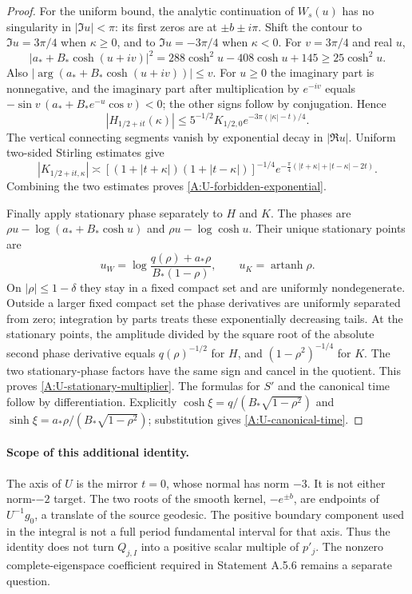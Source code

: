 \begin{proof}
For the uniform bound, the analytic continuation of $W_s(u)$
has no singularity in $|\Im u|<\pi$: its first zeros are
at $\pm b\pm i\pi$.
Shift the contour to $\Im u=3\pi/4$ when $\kappa\geq0$,
and to $\Im u=-3\pi/4$ when $\kappa<0$.
For $v=3\pi/4$ and real $u$,
\[
 |a_*+B_*\cosh(u+iv)|^2
   =288\cosh^2u-408\cosh u+145
   \geq25\cosh^2u.
\]
Also $|\arg(a_*+B_*\cosh(u+iv))|\leq v$.
For $u\geq0$ the imaginary part is nonnegative, and
the imaginary part after multiplication by $e^{-iv}$ equals
$-\sin v\,(a_*+B_*e^{-u}\cos v)<0$;
the other signs follow by conjugation. Hence
\[
 |H_{1/2+it}(\kappa)|
 \leq 5^{-1/2}K_{1/2,0}
       e^{-3\pi(|\kappa|-t)/4}.
\]
The vertical connecting segments vanish by exponential decay in
$|\Re u|$. Uniform two-sided Stirling estimates give
\[
 |K_{1/2+it,\kappa}|
 \asymp
 [(1+|t+\kappa|)(1+|t-\kappa|)]^{-1/4}
 e^{-\frac\pi4(|t+\kappa|+|t-\kappa|-2t)}.
\]
Combining the two estimates proves
\eqref{A:U-forbidden-exponential}.

Finally apply stationary phase separately to $H$ and $K$.
The phases are $\rho u-\log(a_*+B_*\cosh u)$ and
$\rho u-\log\cosh u$.
Their unique stationary points are
\[
 u_W=\log\frac{q(\rho)+a_*\rho}{B_*(1-\rho)},
 \qquad u_K=\operatorname{artanh}\rho .
\]
On $|\rho|\leq1-\delta$ they stay in a fixed compact set and
are uniformly nondegenerate. Outside a larger fixed compact set
the phase derivatives are uniformly separated from zero;
integration by parts treats these exponentially decreasing tails.
At the stationary points, the amplitude divided by the square root
of the absolute second phase derivative equals $q(\rho)^{-1/2}$
for $H$, and $(1-\rho^2)^{-1/4}$ for $K$.
The two stationary-phase factors have the same sign and cancel
in the quotient. This proves \eqref{A:U-stationary-multiplier}.
The formulas for $S'$ and the canonical time follow by differentiation.
Explicitly
$\cosh\xi=q/(B_*\sqrt{1-\rho^2})$ and
$\sinh\xi=a_*\rho/(B_*\sqrt{1-\rho^2})$; substitution gives
\eqref{A:U-canonical-time}.
\end{proof}

\paragraph{Scope of this additional identity.}
The axis of $U$ is the mirror $t=0$, whose normal has norm $-3$.
It is not either norm-$-2$ target.
The two roots of the smooth kernel, $-e^{\pm b}$, are endpoints
of $U^{-1}g_0$, a translate of the source geodesic.
The positive boundary component used in the integral is not a
full period fundamental interval for that axis. Thus the identity
does not turn $Q_{j,I}$ into a positive scalar multiple of $p'_j$.
The nonzero complete-eigenspace coefficient required in
Statement A.5.6 remains a separate question.
